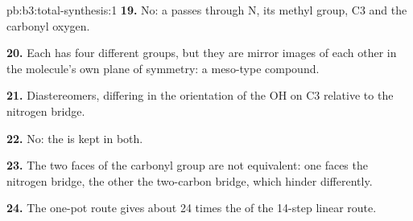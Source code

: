 \begin{solution}{pb:b3:total-synthesis:1}
\textbf{19.} No: a  passes through N, its methyl group, C3 and the carbonyl
oxygen.

\textbf{20.} Each has four different groups, but they are mirror images of each other in
the molecule's own plane of symmetry: a meso-type compound.

\textbf{21.} Diastereomers, differing in the orientation of the OH on C3 relative to
the nitrogen bridge.

\textbf{22.} No: the  is kept in both.

\textbf{23.} The two faces of the carbonyl group are not equivalent: one faces the
nitrogen bridge, the other the two-carbon bridge, which hinder differently.

\textbf{24.} The one-pot route gives about 24 times the  of the 14-step
linear route.
\end{solution}
